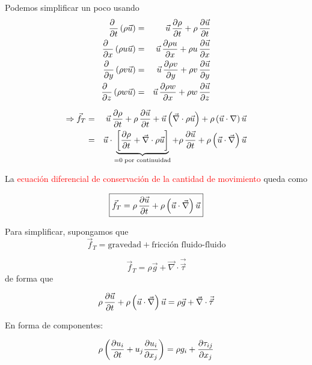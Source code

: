 	
	Podemos simplificar un poco usando 
	\begin{eqnarray}
		\frac{\partial \phantom{t}}{\partial t}\left(\rho\vec{u}\right) & = & \vec{u}\,\frac{\partial \rho}{\partial t}+\rho\,\frac{\partial \vec{u}}{\partial t}\\
		\frac{\partial \phantom{x}}{\partial x}\left(\rho u\vec{u}\right) & = & \vec{u}\,\frac{\partial \rho u}{\partial x}+\rho u\,\frac{\partial \vec{u}}{\partial x}\\
		\frac{\partial \phantom{y}}{\partial y}\left(\rho v\vec{u}\right) & = & \vec{u}\,\frac{\partial \rho v}{\partial y}+\rho v\,\frac{\partial \vec{u}}{\partial y}\\
		\frac{\partial \phantom{z}}{\partial z}\left(\rho w\vec{u}\right) & = & \vec{u}\,\frac{\partial \rho w}{\partial x}+\rho w\,\frac{\partial \vec{u}}{\partial z}
	\end{eqnarray}
	
	\begin{eqnarray}
		\Rightarrow\vec{f}_{T} & = & \vec{u}\,\frac{\partial \rho}{\partial t}+\rho\,\frac{\partial \vec{u}}{\partial t}+\vec{u}\left(\vec{\nabla}\cdot\rho\vec{u}\right)+\rho\left(\vec{u}\cdot\nabla\right)\vec{u}\\
		& = & \vec{u}\cdot\underbrace{\left[\frac{\partial \rho}{\partial t}+\vec{\nabla}\cdot\rho\vec{u}\right]}_{=0\;\text{por continuidad}}+\rho\,\frac{\partial \vec{u}}{\partial t}+\rho\left(\vec{u}\cdot\vec{\nabla}\right)\vec{u}
	\end{eqnarray}
	

	
	La \textcolor{red}{ecuación diferencial de conservación de la cantidad
		de movimiento} queda como 
	
	\begin{equation}
		\boxed{\vec{f}_{T}=\rho\,\frac{\partial \vec{u}}{\partial t}+\rho\left(\vec{u}\cdot\vec{\nabla}\right)\vec{u}}
	\end{equation}
	
	
	Para simplificar, supongamos que 
	\[
	\vec{f}_{T}=\text{gravedad}+\text{fricción fluido-fluido}
	\]
	
	\[
	\vec{f}_{T}=\rho\vec{g}+\vec{\nabla}\cdot\vec{\vec{\tau}}
	\]
	de forma que 
	
	\begin{equation}
		\rho\,\frac{\partial \vec{u}}{\partial t}+\rho\left(\vec{u}\cdot\vec{\nabla}\right)\vec{u}=\rho\vec{g}+\vec{\nabla}\cdot\vec{\vec{\tau}}
	\end{equation}
	
	
	En forma de componentes: 
	
	\begin{equation}
		\rho\left(\frac{\partial u_{i}}{\partial t}+u_{j}\frac{\partial u_{i}}{\partial x_{j}}\right)=\rho g_{i}+\frac{\partial \tau_{ij}}{\partial x_{j}}
	\end{equation}
	
